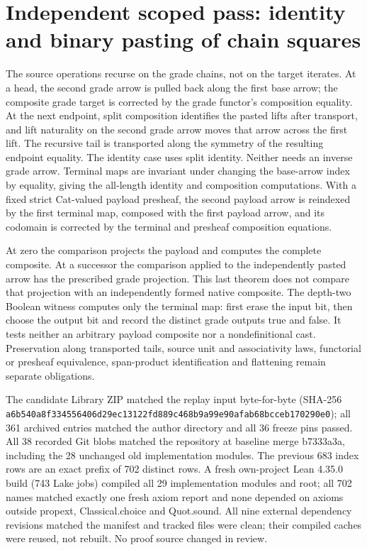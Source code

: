 \documentclass{article}
\begin{document}
\section*{Independent scoped pass: identity and binary pasting of chain squares}
The source operations recurse on the grade chains, not on the target iterates. At a head, the second grade arrow is pulled back along the first base arrow; the composite grade target is corrected by the grade functor's composition equality. At the next endpoint, split composition identifies the pasted lifts after transport, and lift naturality on the second grade arrow moves that arrow across the first lift. The recursive tail is transported along the symmetry of the resulting endpoint equality. The identity case uses split identity. Neither needs an inverse grade arrow. Terminal maps are invariant under changing the base-arrow index by equality, giving the all-length identity and composition computations. With a fixed strict Cat-valued payload presheaf, the second payload arrow is reindexed by the first terminal map, composed with the first payload arrow, and its codomain is corrected by the terminal and presheaf composition equations.
\par At zero the comparison projects the payload and computes the complete composite. At a successor the comparison applied to the independently pasted arrow has the prescribed grade projection. This last theorem does not compare that projection with an independently formed native composite. The depth-two Boolean witness computes only the terminal map: first erase the input bit, then choose the output bit and record the distinct grade outputs true and false. It tests neither an arbitrary payload composite nor a nondefinitional cast. Preservation along transported tails, source unit and associativity laws, functorial or presheaf equivalence, span-product identification and flattening remain separate obligations.
\par The candidate Library ZIP matched the replay input byte-for-byte (SHA-256 \texttt{a6b540a8f334556406d29ec13122fd889c468b9a99e90afab68bcceb170290e0}); all 361 archived entries matched the author directory and all 36 freeze pins passed. All 38 recorded Git blobs matched the repository at baseline merge b7333a3a, including the 28 unchanged old implementation modules. The previous 683 index rows are an exact prefix of 702 distinct rows. A fresh own-project Lean 4.35.0 build (743 Lake jobs) compiled all 29 implementation modules and root; all 702 names matched exactly one fresh axiom report and none depended on axioms outside propext, Classical.choice and Quot.sound. All nine external dependency revisions matched the manifest and tracked files were clean; their compiled caches were reused, not rebuilt. No proof source changed in review.
\end{document}
